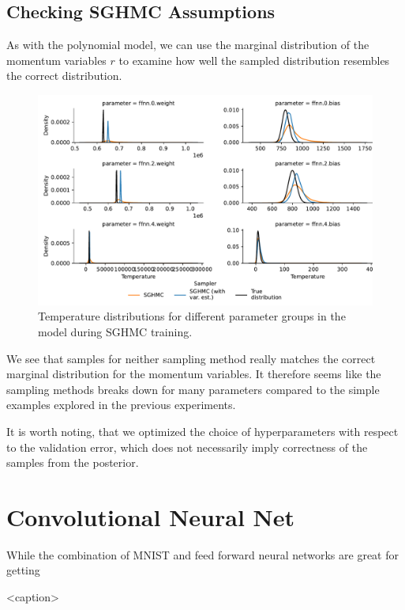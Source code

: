 \subsection{Checking SGHMC Assumptions}
As with the polynomial model, we can use the marginal distribution of the momentum variables $r$ to examine how well the sampled distribution resembles the correct distribution. 
\begin{figure}[htbp]
    \centering
    \includegraphics[width=\linewidth]{Figures/mnist-temperatures.pdf}
    \caption{Temperature distributions for different parameter groups in the model during SGHMC training.}
    \label{fig:mnist-temperatures}
\end{figure}
We see that samples for neither sampling method really matches the correct marginal distribution for the momentum variables. 
It therefore seems like the sampling methods breaks down for many parameters compared to the simple examples explored in the previous experiments.

It is worth noting, that we optimized the choice of hyperparameters with respect to the validation error, which does not necessarily imply correctness of the samples from the posterior. 




\section{Convolutional Neural Net}
While the combination of MNIST and feed forward neural networks are great for getting


\begin{table}[htbp]
    \centering
    
    \caption{<caption>}
    \label{<label>}
\end{table}

